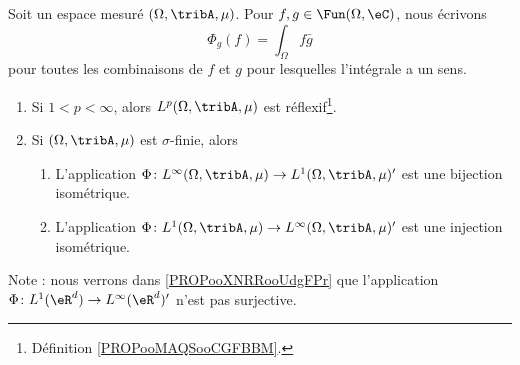 \begin{theorem}     \label{THOooXMVTooBAbyvr}
	Soit un espace mesuré \( (\Omega,\tribA,\mu)\). Pour \( f,g\in\Fun(\Omega,\eC)\), nous écrivons
	\begin{equation}
		\Phi_g(f)=\int_{\Omega}f\bar g
	\end{equation}
	pour toutes les combinaisons de \( f\) et \( g\) pour lesquelles l'intégrale a un sens.
	\begin{enumerate}
		\item   \label{ITEMooNCVEooTyNsoJ}
		      Si \( 1<p<\infty\), alors \( L^p(\Omega,\tribA,\mu)\) est réflexif\footnote{Définition \ref{PROPooMAQSooCGFBBM}.}.
		\item   \label{ITEMooTQDJooFShTiA}
		      Si \( (\Omega,\tribA,\mu)\) est \( \sigma\)-finie, alors
		      \begin{enumerate}
			      \item\label{ITEMooHMMZooMQxWgB}
			            L'application \( \Phi\colon L^{\infty}(\Omega,\tribA,\mu)\to L^1(\Omega,\tribA,\mu)'\) est une bijection isométrique.
			      \item       \label{ITEMooBFFZooNxoHER}
			            L'application \( \Phi\colon L^1(\Omega,\tribA,\mu)\to L^{\infty}(\Omega,\tribA,\mu)'\) est une injection isométrique.
		      \end{enumerate}
	\end{enumerate}
	Note : nous verrons dans \ref{PROPooXNRRooUdgFPr} que l'application \( \Phi\colon L^1(\eR^d)\to L^{\infty}(\eR^d)'\) n'est pas surjective.
\end{theorem}


